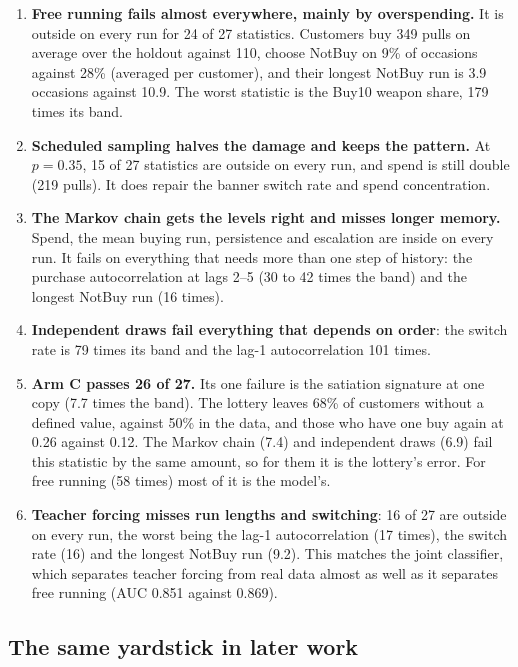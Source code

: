 \documentclass[11pt]{article}
\begin{document}
\begin{enumerate}
\item \textbf{Free running fails almost everywhere, mainly by overspending.} It
  is outside on every run for 24 of 27 statistics. Customers buy 349 pulls on
  average over the holdout against 110, choose NotBuy on 9\% of occasions
  against 28\% (averaged per customer), and their longest NotBuy run is 3.9
  occasions against 10.9. The worst statistic is the Buy10 weapon share, 179
  times its band.
\item \textbf{Scheduled sampling halves the damage and keeps the pattern.} At
  $p = 0.35$, 15 of 27 statistics are outside on every run, and spend is still
  double (219 pulls). It does repair the banner switch rate and spend
  concentration.
\item \textbf{The Markov chain gets the levels right and misses longer memory.}
  Spend, the mean buying run, persistence and escalation are inside on every
  run. It fails on everything that needs more than one step of history: the
  purchase autocorrelation at lags 2--5 (30 to 42 times the band) and the
  longest NotBuy run (16 times).
\item \textbf{Independent draws fail everything that depends on order}: the
  switch rate is 79 times its band and the lag-1 autocorrelation 101 times.
\item \textbf{Arm C passes 26 of 27.} Its one failure is the satiation signature
  at one copy (7.7 times the band). The lottery leaves 68\% of customers without
  a defined value, against 50\% in the data, and those who have one buy again at
  0.26 against 0.12. The Markov chain (7.4) and independent draws (6.9) fail
  this statistic by the same amount, so for them it is the lottery's error. For
  free running (58 times) most of it is the model's.
\item \textbf{Teacher forcing misses run lengths and switching}: 16 of 27 are
  outside on every run, the worst being the lag-1 autocorrelation (17 times),
  the switch rate (16) and the longest NotBuy run (9.2). This matches the joint
  classifier, which separates teacher forcing from real data almost as well as
  it separates free running (AUC 0.851 against 0.869).
\end{enumerate}

\subsection{The same yardstick in later work}
\end{document}
